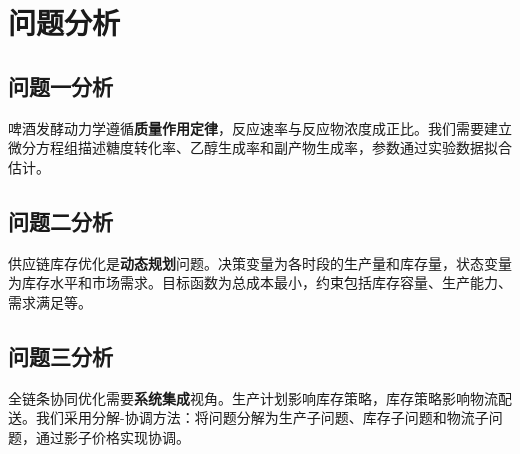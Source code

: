 \newpage
\section{问题分析}

\subsection{问题一分析}
啤酒发酵动力学遵循\textbf{质量作用定律}，反应速率与反应物浓度成正比。我们需要建立微分方程组描述糖度转化率、乙醇生成率和副产物生成率，参数通过实验数据拟合估计。

\subsection{问题二分析}
供应链库存优化是\textbf{动态规划}问题。决策变量为各时段的生产量和库存量，状态变量为库存水平和市场需求。目标函数为总成本最小，约束包括库存容量、生产能力、需求满足等。

\subsection{问题三分析}
全链条协同优化需要\textbf{系统集成}视角。生产计划影响库存策略，库存策略影响物流配送。我们采用分解-协调方法：将问题分解为生产子问题、库存子问题和物流子问题，通过影子价格实现协调。
